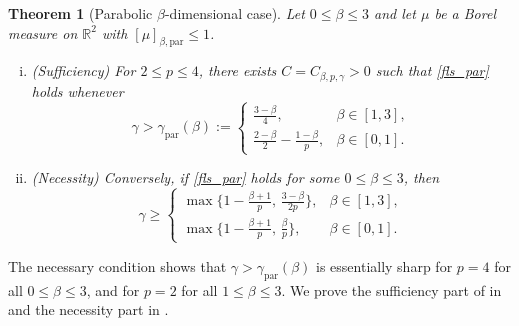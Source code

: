 \documentclass[11pt]{amsart}
\newtheorem{theorem}{Theorem}[section]
\theoremstyle{definition}
\theoremstyle{remark}
\newcommand{\R}{\mathbb{R}}
\begin{document}
\begin{theorem}[Parabolic $\beta$-dimensional case]\label{FLSS_par}
Let $0\le \beta \le 3$ and let $\mu$ be a Borel measure on $\R^2$ with $[\mu]_{\beta,\mathrm{par}}\le1$. 
\vspace{-.2cm}
\begin{enumerate}[(i)]
\item 
\textit{(Sufficiency)} 
For $2\le p\le 4$, there exists $C=C_{\beta,p,\gamma}>0$ such that \eqref{fls_par} holds whenever
\[
\gamma>\gamma_{\text{par}}(\beta):=
  \begin{cases}
\frac{3-\beta}{4}, & \beta\in[1,3],\\[.4ex]
\frac{2-\beta}{2} - \frac{1-\beta}{p}, & \beta\in[0,1].
  \end{cases}
\]
\item 
\textit{(Necessity)} 
Conversely, if \eqref{fls_par} holds for some $0\le\beta\le 3$, then
\[
  \gamma\ge
  \begin{cases}
  \max\!\big\{1-\frac{\beta+1}{p},\, \frac{3-\beta}{2p}\big\}, & \beta\in[1,3],\\[1ex]
\max\!\big\{1-\frac{\beta+1}{p},\,\frac\beta p\}, & \beta\in[0,1].
  \end{cases}
\]
\end{enumerate}
\end{theorem}

The necessary condition shows that $\gamma> \gamma_{\text{par}}(\beta)$ is essentially sharp for $p=4$ for all $0\leq \beta\leq 3$, and for $p=2$ for all $1\leq \beta\leq 3$.
We prove the sufficiency part of  in  and the necessity part in .
\end{document}
